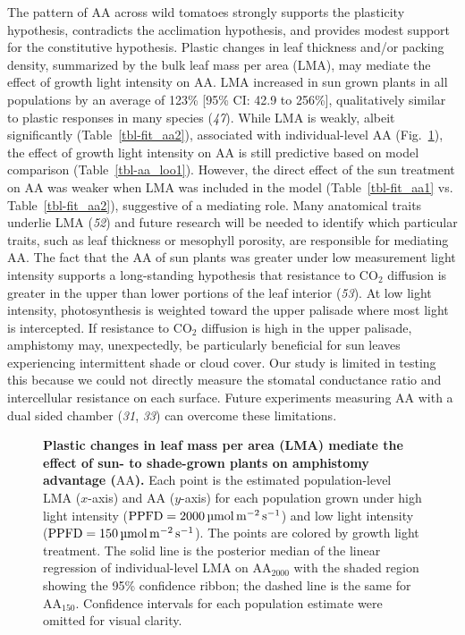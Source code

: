 \documentclass[
  letterpaper,
  DIV=11,
  numbers=noendperiod]{scrartcl}
\makeatletter
\newcommand*\pandocbounded[1]{%
  \sbox\pandoc@box{#1}%
  \Gscale@div\@tempa{\textheight}{\dimexpr\ht\pandoc@box+\dp\pandoc@box\relax}%
  \Gscale@div\@tempb{\linewidth}{\wd\pandoc@box}%
  \ifdim\@tempb\p@<\@tempa\p@\let\@tempa\@tempb\fi%
  \ifdim\@tempa\p@<\p@\scalebox{\@tempa}{\usebox\pandoc@box}%
  \else\usebox{\pandoc@box}%
  \fi%
}
\newcommand{\aahigh}{\mathrm{AA}_{2000}}
\newcommand{\aalow}{\mathrm{AA}_{150}}
\newcommand{\aax}{$\mathrm{AA}$}
\newcommand{\ppfdequals}[1]{$\mathrm{PPFD} = \qty{#1}{\micro\mol\raiseto{-2}\meter\raiseto{-1}\second}$}
\makeatother
\begin{document}
The pattern of \aax{} across wild tomatoes strongly supports the
plasticity hypothesis, contradicts the acclimation hypothesis, and
provides modest support for the constitutive hypothesis. Plastic changes
in leaf thickness and/or packing density, summarized by the bulk leaf
mass per area (LMA), may mediate the effect of growth light intensity on
\aax{}. LMA increased in sun grown plants in all populations by an
average of 123\% {[}95\% CI: 42.9 to 256\%{]}, qualitatively similar to
plastic responses in many species (\emph{47}). While LMA is weakly,
albeit significantly (Table~\ref{tbl-fit_aa2}), associated with
individual-level \aax{} (Fig.~\ref{fig-lma_aa}), the effect of growth
light intensity on \aax{} is still predictive based on model comparison
(Table~\ref{tbl-aa_loo1}). However, the direct effect of the sun
treatment on \aax{} was weaker when LMA was included in the model
(Table~\ref{tbl-fit_aa1} vs. Table~\ref{tbl-fit_aa2}), suggestive of a
mediating role. Many anatomical traits underlie LMA (\emph{52}) and
future research will be needed to identify which particular traits, such
as leaf thickness or mesophyll porosity, are responsible for mediating
\aax{}. The fact that the \aax{} of sun plants was greater under low
measurement light intensity supports a long-standing hypothesis that
resistance to CO\(_2\) diffusion is greater in the upper than lower
portions of the leaf interior (\emph{53}). At low light intensity,
photosynthesis is weighted toward the upper palisade where most light is
intercepted. If resistance to CO\(_2\) diffusion is high in the upper
palisade, amphistomy may, unexpectedly, be particularly beneficial for
sun leaves experiencing intermittent shade or cloud cover. Our study is
limited in testing this because we could not directly measure the
stomatal conductance ratio and intercellular resistance on each surface.
Future experiments measuring \aax{} with a dual sided chamber
(\emph{31}, \emph{33}) can overcome these limitations.

\begin{figure}

\centering{

\pandocbounded{\texttt{[image: ms\_files/figure-pdf/fig-lma\_aa-1.pdf]}}

}

\caption{\label{fig-lma_aa}\textbf{Plastic changes in leaf mass per area (LMA) mediate the effect of sun- to shade-grown plants on amphistomy advantage (\aax{}).}
Each point is the estimated population-level LMA (\(x\)-axis) and \aax{}
(\(y\)-axis) for each population grown under high light intensity
(\ppfdequals{2000}) and low light intensity (\ppfdequals{150}). The
points are colored by growth light treatment. The solid line is the
posterior median of the linear regression of individual-level LMA on
\(\aahigh\) with the shaded region showing the 95\% confidence ribbon;
the dashed line is the same for \(\aalow\). Confidence intervals for
each population estimate were omitted for visual clarity.}

\end{figure}%
\end{document}
